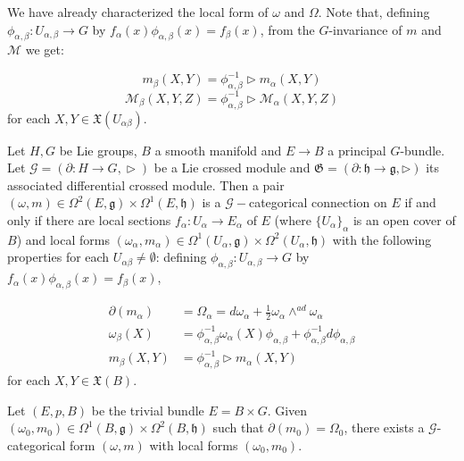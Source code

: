We have already characterized the local form of $\omega$ and $\Omega$. Note that, defining  $\phi_{\alpha,\beta}:U_{\alpha,\beta}\rightarrow G$ by $f_\alpha (x)\phi_{\alpha,\beta}(x)=f_\beta(x)$,  from the $G$-invariance of $m$ and $\mathcal{M}$ we get:

\[
 m_\beta(X,Y)=\phi_{\alpha,\beta}^{-1}\vartriangleright m_\alpha(X,Y)
\]
\[
 \mathcal{M}_\beta (X,Y,Z)=\phi_{\alpha,\beta}^{-1}\vartriangleright \mathcal{M}_\alpha(X,Y,Z)
\]
for each $X,Y\in \mathfrak{X}(U_{\alpha\beta})$.


\begin{prop}\label{localform}
 Let $H,G$ be Lie groups, $B$ a smooth manifold and $E\rightarrow B$ a principal $G$-bundle. Let $\mathscr{G}=(\partial:H\rightarrow G,\vartriangleright)$ be a Lie crossed module and $\mathfrak{G}=(\partial:\mathfrak{h}\rightarrow\mathfrak{g},\triangleright)$ its associated differential crossed module.
Then a pair $(\omega,m)\in \Omega^2(E,\mathfrak{g})\times \Omega^1(E,\mathfrak{h})$ is a $\mathscr{G}-$categorical connection on $E$ if and only if there are local sections $f_\alpha:U_\alpha\rightarrow E_\alpha$ of $E$ (where $\{U_\alpha\}_\alpha$ is an open cover of $B$) and local forms $(\omega_\alpha,m_\alpha)\in \Omega^1(U_\alpha,\mathfrak{g})\times\Omega^2(U_\alpha,\mathfrak{h})$ with the following properties for each $U_{\alpha\beta}\neq\emptyset$: defining $\phi_{\alpha,\beta}:U_{\alpha,\beta}\rightarrow G$ by $f_\alpha (x)\phi_{\alpha,\beta}(x)=f_\beta(x)$, 

\begin{align}
 \partial(m_\alpha)&=\Omega_\alpha=d\omega_\alpha+\frac{1}{2}\omega_\alpha\wedge^{ad} \omega_\alpha \label{partialomega} \\
 \omega_\beta(X)&=\phi^{-1}_{\alpha,\beta}\omega_\alpha(X)\phi_{\alpha,\beta}+\phi^{-1}_{\alpha,\beta}d\phi_{\alpha,\beta} \label{connection}\\
 m_\beta(X,Y)&=\phi^{-1}_{\alpha,\beta}\triangleright m_\alpha(X,Y) \label{compatform}
\end{align}
for each $X,Y\in \mathfrak{X}(B)$.
\end{prop}
\begin{lemma}
Let $(E,p,B)$ be the trivial bundle $E=B\times G$. Given $(\omega_0,m_0)\in \Omega^1(B,\mathfrak{g})\times \Omega^2(B,\mathfrak{h})$ such that $\partial(m_0)=\Omega_0$, there exists a $\mathcal{G}$-categorical form $(\omega,m)$ with local forms $(\omega_0,m_0)$.
\end{lemma}

